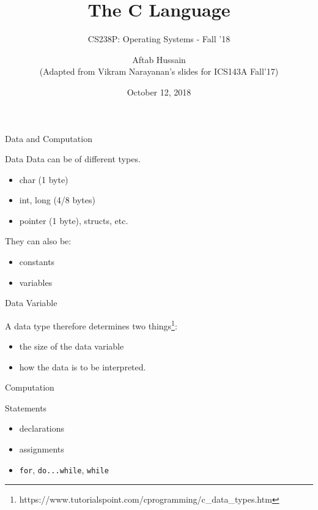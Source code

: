 \documentclass[10pt]{beamer}
\title{The C Language}
\subtitle{CS238P: Operating Systems - Fall '18}
\author{Aftab Hussain\\ (Adapted from Vikram Narayanan's slides for ICS143A Fall'17)}
\date{October 12, 2018}
\institute{University of California, Irvine}
\begin{document}
\maketitle

\begin{frame}[standout]
  Data and Computation
\end{frame}

\begin{frame}{Data}
 Data can be of different types.
\begin{itemize}
\item char (1 byte)
\item int, long (4/8 bytes)
\item pointer (1 byte), structs, etc.
\end{itemize}
They can also be:
\begin{itemize}
\item constants
\item variables
\end{itemize}
\end{frame}

\begin{frame}{Data Variable}

  A data type therefore determines two things\footnote{https://www.tutorialspoint.com/cprogramming/c\_data\_types.htm}:

 \begin{itemize}
 \item the size of the data variable
 \item how the data is to be interpreted.
 \end{itemize}

 \end{frame}

 \begin{frame}[standout]
  Computation
\end{frame}

\begin{frame}{Statements}
\begin{itemize}
\item declarations
\item assignments
\item \texttt{for}, \texttt{do...while}, \texttt{while}
\end{itemize}
\end{frame}
\end{document}
